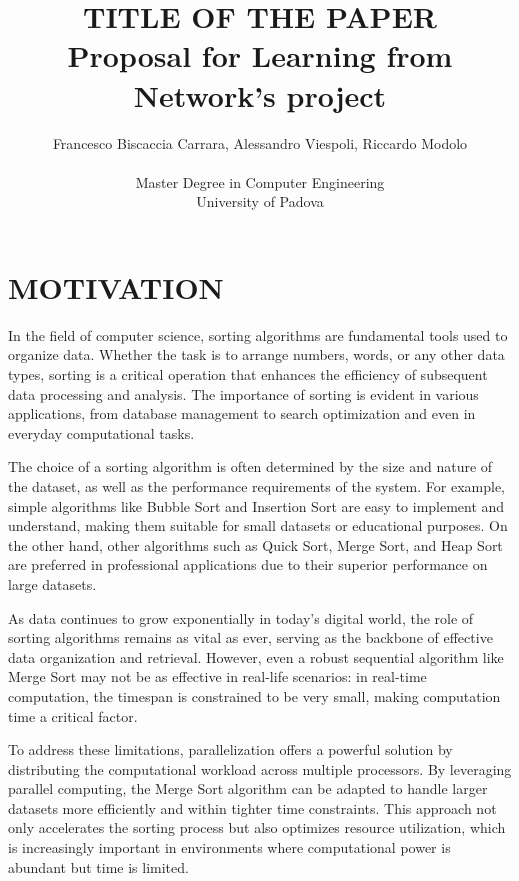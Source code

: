 \documentclass[article,12pt,conference]{ieeeconf} %
\title{\LARGE TITLE OF THE PAPER \\
\large Proposal for Learning from Network's project \\}
\author{Francesco Biscaccia Carrara, Alessandro Viespoli, Riccardo Modolo %
\\\\ Master Degree in Computer Engineering \\
University of Padova \\
}
\begin{document}
\maketitle
\thispagestyle{plain}
\pagestyle{plain}

\section{MOTIVATION} 

In the field of computer science, sorting algorithms are fundamental tools used to organize data. Whether the task is to arrange numbers, words, or any other data types, sorting is a critical operation that enhances the efficiency of subsequent data processing and analysis. The importance of sorting is evident in various applications, from database management to search optimization and even in everyday computational tasks.\par

The choice of a sorting algorithm is often determined by the size and nature of the dataset, as well as the performance requirements of the system. For example, simple algorithms like Bubble Sort and Insertion Sort are easy to implement and understand, making them suitable for small datasets or educational purposes. On the other hand, other algorithms such as Quick Sort, Merge Sort, and Heap Sort are preferred in professional applications due to their superior performance on large datasets.\par

As data continues to grow exponentially in today's digital world, the role of sorting algorithms remains as vital as ever, serving as the backbone of effective data organization and retrieval. However, even a robust sequential algorithm like Merge Sort may not be as effective in real-life scenarios: in real-time computation, the timespan is constrained to be very small, making computation time a critical factor.\par

To address these limitations, parallelization offers a powerful solution by distributing the computational workload across multiple processors. By leveraging parallel computing, the Merge Sort algorithm can be adapted to handle larger datasets more efficiently and within tighter time constraints. This approach not only accelerates the sorting process but also optimizes resource utilization, which is increasingly important in environments where computational power is abundant but time is limited.\par
\end{document}
